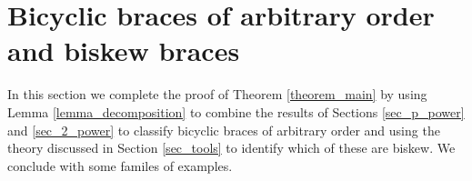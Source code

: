 \documentclass[reqno]{amsart}
\theoremstyle{definition}
\newtheorem{theorem}{Theorem}[section]
\DeclareMathOperator{\Hol}{\mbox{Hol}}
\begin{document}


\section{Bicyclic braces of arbitrary order and biskew braces} \label{sec_combining}

In this section we complete the proof of Theorem \ref{theorem_main} by using Lemma \ref{lemma_decomposition} to combine the results of Sections \ref{sec_p_power} and \ref{sec_2_power} to classify bicyclic braces of arbitrary order and using the theory discussed in Section \ref{sec_tools} to identify which of these are biskew. We conclude with some familes of examples. 
\end{document}

